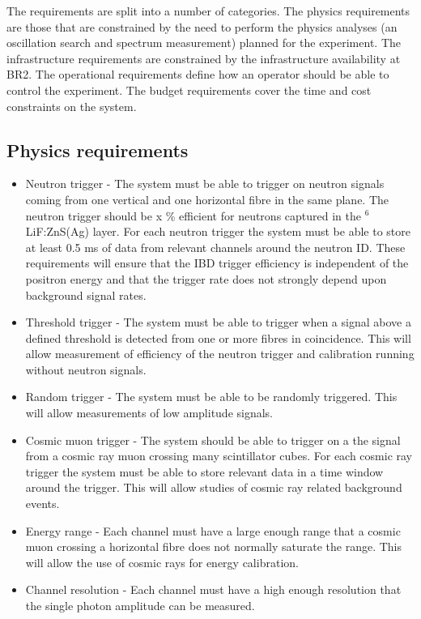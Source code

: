 \documentclass[a4paper]{article}
\begin{document}
The requirements are split into a number of categories.
The physics requirements are those that are constrained by the need to perform the physics analyses (an oscillation search and spectrum measurement) planned for the experiment.
The infrastructure requirements are constrained by the infrastructure availability at BR2.
The operational requirements define how an operator should be able to control the experiment.
The budget requirements cover the time and cost constraints on the system.

\subsection{Physics requirements}

\begin{itemize}
\item Neutron trigger - The system must be able to trigger on neutron signals coming from one vertical and one horizontal fibre in the same plane. 
    The neutron trigger should be x \% efficient for neutrons captured in the $^6$LiF:ZnS(Ag) layer. 
    For each neutron trigger the system must be able to store at least 0.5 ms of data from relevant channels around the neutron ID. 
    These requirements will ensure that the IBD trigger efficiency is independent of the positron energy and that the trigger rate does not strongly depend upon background signal rates.
\item Threshold trigger - The system must be able to trigger when a signal above a defined threshold is detected from one or more fibres in coincidence.
    This will allow measurement of efficiency of the neutron trigger and calibration running without neutron signals.
\item Random trigger -  The system must be able to be randomly triggered. 
    This will allow measurements of low amplitude signals.
\item Cosmic muon trigger - The system should be able to trigger on a the signal from a cosmic ray muon crossing many scintillator cubes. 
    For each cosmic ray trigger the system must be able to store relevant data in a time window around the trigger. 
    This will allow studies of cosmic ray related background events.
\item Energy range - Each channel must have a large enough range that a cosmic muon crossing a horizontal fibre does not normally saturate the range. 
    This will allow the use of cosmic rays for energy calibration. 
\item Channel resolution - Each channel must have a high enough resolution that the single photon amplitude can be measured. 

\end{itemize}
\end{document}
